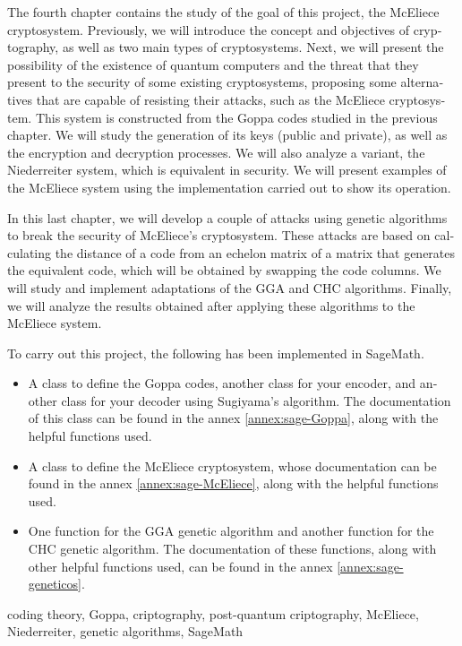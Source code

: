 \begin{otherlanguage}{english}
\newpage


The fourth chapter contains the study of the goal of this project, the McEliece cryptosystem. Previously, we will introduce the concept and objectives of cryptography, as well as two main types of cryptosystems. Next, we will present the possibility of the existence of quantum computers and the threat that they present to the security of some existing cryptosystems, proposing some alternatives that are capable of resisting their attacks, such as the McEliece cryptosystem. This system is constructed from the Goppa codes studied in the previous chapter. We will study the generation of its keys (public and private), as well as the encryption and decryption processes. We will also analyze a variant, the Niederreiter system, which is equivalent in security. We will present examples of the McEliece system using the implementation carried out to show its operation.


In this last chapter, we will develop a couple of attacks using genetic algorithms to break the security of McEliece's cryptosystem. These attacks are based on calculating the distance of a code from an echelon matrix of a matrix that generates the equivalent code, which will be obtained by swapping the code columns. We will study and implement adaptations of the GGA and CHC algorithms. Finally, we will analyze the results obtained after applying these algorithms to the McEliece system.

To carry out this project, the following has been implemented in SageMath.

\begin{itemize}
    \item A class to define the Goppa codes, another class for your encoder, and another class for your decoder using Sugiyama's algorithm. The documentation of this class can be found in the annex \ref{annex:sage-Goppa}, along with the helpful functions used.
    \item A class to define the McEliece cryptosystem, whose documentation can be found in the annex \ref{annex:sage-McEliece}, along with the helpful functions used.
    \item One function for the GGA genetic algorithm and another function for the CHC genetic algorithm. The documentation of these functions, along with other helpful functions used, can be found in the annex \ref{annex:sage-geneticos}.
\end{itemize}

\small{ coding theory, \; Goppa, \; criptography, \; post-quantum criptography, \; McEliece, \; Niederreiter, \; genetic algorithms, \; SageMath}

\end{otherlanguage}